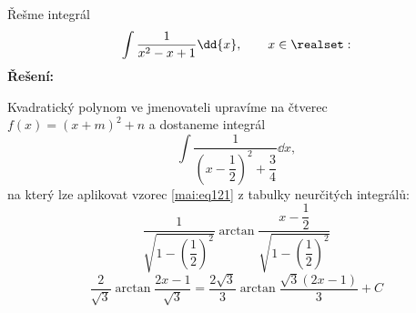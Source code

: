 \begin{mdframed}[style=mdexam]
  \begin{example}\label{MAI:exam120}
    Řešme integrál 
    \begin{equation*}
      \int\frac{1}{x^2 - x + 1}\dd{x}, \qquad x\in\realset:
    \end{equation*}
    \noindent\textbf{Řešení:}

    Kvadratický polynom ve jmenovateli upravíme na čtverec \(f(x) = (x + m)^2 + n\) a dostaneme
    integrál
    \begin{equation*}
      \int\dfrac{1}{\left(x-\dfrac{1}{2}\right)^2+\dfrac{3}{4}}\dd{x},
    \end{equation*}
    na který lze aplikovat vzorec \ref{mai:eq121} z tabulky neurčitých integrálů: 
    \begin{equation*}
      \dfrac{1}{\sqrt{1-\left(\dfrac{1}{2}\right)^2}}\arctan
      \dfrac{x-\dfrac{1}{2}}{\sqrt{1-\left(\dfrac{1}{2}\right)^2}} 
    \end{equation*}
    \begin{equation*}
      \dfrac{2}{\sqrt{3}}\arctan\dfrac{2x-1}{\sqrt{3}}  =
      \dfrac{2\sqrt{3}}{3}\arctan\dfrac{\sqrt{3}(2x-1)}{3} + C
    \end{equation*}
  \end{example}
\end{mdframed}